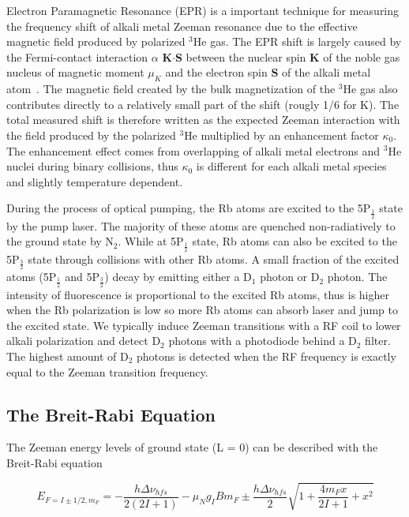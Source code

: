 Electron Paramagnetic Resonance (EPR) is a important technique for measuring the frequency shift of alkali metal Zeeman resonance due to the effective magnetic field produced by polarized $^{3}$He gas. The EPR shift is largely caused by the Fermi-contact interaction $\alpha$ {\bf K$\cdot$S} between the nuclear spin {\bf K} of the noble gas nucleus of magnetic moment $\mu_{K}$ and the electron spin {\bf S} of the alkali metal atom~\cite{PhysRevA.71.013414}. The magnetic field created by the bulk magnetization of the $^{3}$He gas also contributes directly to a relatively small part of the shift (rougly 1/6 for K). The total measured shift is therefore written as the expected Zeeman interaction with the field produced by the polarized $^{3}$He multiplied by an enhancement factor $\kappa_{0}$. The enhancement effect comes from overlapping of alkali metal electrons and $^{3}$He nuclei during binary collisions, thus $\kappa_{0}$ is different for each alkali metal species and slightly temperature dependent.

During the process of optical pumping, the Rb atoms are excited to the 5P$_{\frac{1}{2}}$ state by the pump laser. The majority of these atoms are quenched non-radiatively to the ground state by N$_{2}$. While at 5P$_{\frac{1}{2}}$ state, Rb atoms can also be excited to the 5P$_{\frac{3}{2}}$ state through collisions with other Rb atoms. A small fraction of the excited atoms (5P$_{\frac{1}{2}}$ and 5P$_{\frac{3}{2}}$) decay by emitting either a D$_{1}$ photon or D$_{2}$ photon. The intensity of fluorescence is proportional to the excited Rb atoms, thus is higher when the Rb polarization is low so more Rb atoms can absorb laser and jump to the excited state. We typically induce Zeeman transitions with a RF coil to lower alkali polarization and detect D$_{2}$ photons with a photodiode behind a D$_{2}$ filter. The highest amount of D$_{2}$ photons is detected when the RF frequency is exactly equal to the Zeeman transition frequency.

\subsection{The Breit-Rabi Equation}

The Zeeman energy levels of ground state (L = 0) can be described with the Breit-Rabi equation

\begin{equation}
E_{F=I\pm 1/2, m_{F}}=-\frac{h\Delta \nu_{hfs}}{2(2I+1)}-\mu_{N}g_{I}Bm_{F}\pm \frac{h\Delta \nu_{hfs}}{2}\sqrt{1+\frac{4m_{F}x}{2I+1} +x^{2}}
\end{equation}

